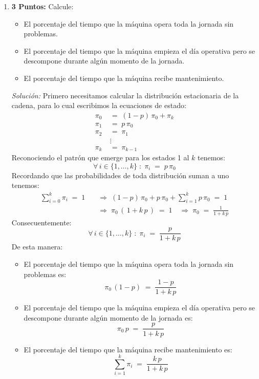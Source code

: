 \documentclass[ a4paper, twoside, 11pt]{article}
\begin{document}
\begin{problem}
\begin{enumerate}[label=\textbf{\alph*)}]
\begin{figure}[htb]
\centering
\def\svgwidth{0.9\columnwidth}

\end{figure}

\item \textbf{3 Puntos:} Calcule: 
\begin{itemize}
\item El porcentaje del tiempo que la m\'aquina opera toda la jornada sin problemas. 
\item El porcentaje del tiempo que la m\'aquina empieza el d\'ia operativa pero se descompone durante alg\'un momento de la jornada. 
\item El porcentaje del tiempo que la m\'aquina recibe mantenimiento. 
\end{itemize}

\emph{Soluci\'on:} Primero necesitamos calcular la distribuci\'on estacionaria de la cadena, para lo cual escribimos la ecuaciones de estado: 
\begin{align*}
\pi_0 \; & = \; (1-p) \, \pi_0 + \pi_k \\
\pi_1 \; & = \; p \, \pi_0 \\
\pi_2 \; & = \; \pi_1 \\
& \vdots \\
\pi_{k} \; & = \; \pi_{k-1}
\end{align*}
Reconociendo el patr\'on que emerge para los estados 1 al $k$ tenemos: 
\[
\forall \, i \in \{ 1, \dots, k\} \; \colon \;
\pi_i \; = \; p \, \pi_0
\]
Recordando que las probabilidades de toda distribuci\'on suman a uno tenemos: 
\begin{align*}
\sum_{i=0}^k \pi_i \; = \; 1 \quad
& \Longrightarrow \; (1-p) \, \pi_0 + p \, \pi_0 + \sum_{i=1}^k p \, \pi_0 \; = \; 1 \\[1ex]
& \Longrightarrow \; \pi_0 \, ( \, 1 + k \, p \, ) \; = \; 1
\quad \Longrightarrow \;
\pi_0 \; = \; \frac{1}{ 1 + k \, p }
\end{align*}
Consecuentemente: 
\[
\forall \, i \in \{ 1, \dots, k\} \; \colon \;
\pi_i \; = \; \frac{p}{ 1 + k \, p }
\]
De esta manera: 
\begin{itemize}
\item El porcentaje del tiempo que la m\'aquina opera toda la jornada sin problemas es:
\[
\pi_0 \, (1-p) \; = \; \frac{1-p}{ 1 + k \, p }
\]
\item El porcentaje del tiempo que la m\'aquina empieza el d\'ia operativa pero se descompone durante alg\'un momento de la jornada es:
\[
\pi_0 \, p \; = \; \frac{p}{ 1 + k \, p }
\]
\item El porcentaje del tiempo que la m\'aquina recibe mantenimiento es:
\[
\sum_{i=1}^k \pi_i \; = \; \frac{ k \, p }{ 1 + k \, p }
\]
\end{itemize}

\end{enumerate}

\end{problem}
\fullskip
\end{document}
